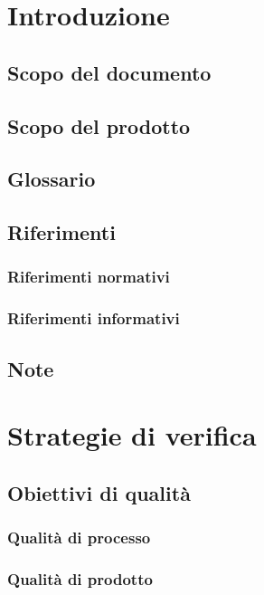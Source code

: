 \documentclass[a4paper, oneside, openany, dvipsnames, table]{article}
\begin{document}
\copertina{}

\newpage
\tableofcontents
\newpage
\section{Introduzione}
	\subsection{Scopo del documento}
		
	\subsection{Scopo del prodotto}
		
	\subsection{Glossario}
		
	\subsection{Riferimenti}
		\subsubsection{Riferimenti normativi}
			
		\subsubsection{Riferimenti informativi}
			
	\subsection{Note}
			
	\newpage
\section{Strategie di verifica}
	
	\subsection{Obiettivi di qualità}
		\subsubsection{Qualità di processo}
			
		\subsubsection{Qualità di prodotto}
			
\end{document}
